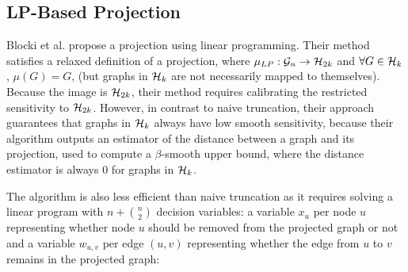 \subsection*{LP-Based Projection}

Blocki et al. propose a projection using linear programming. Their method satisfies a relaxed definition of a projection, where $\mu_{LP} : \mathcal{G}_n \to \mathcal{H}_{2k}$ and $\forall G \in \mathcal{H}_{k}$, $\mu(G) = G$, (but graphs in $\mathcal{H}_k$ are not necessarily mapped to themselves). Because the image is $\mathcal{H}_{2k}$, their method requires calibrating the restricted sensitivity to $\mathcal{H}_{2k}$. However, in contrast to naive truncation, their approach guarantees that graphs in $\mathcal{H}_k$ always have low smooth sensitivity, because their algorithm outputs an estimator of the distance between a graph and its projection, used to compute a $\beta$-smooth upper bound, where the distance estimator is always $0$ for graphs in $\mathcal{H}_k$.

The algorithm is also less efficient than naive truncation as it requires solving a  linear program with $n + \binom{n}{2}$ decision variables: a variable $x_u$ per node $u$ representing whether node $u$ should be removed from the projected graph or not and a variable $w_{u,v}$ per edge $(u,v)$ representing whether the edge from $u$ to $v$ remains in the projected graph:

